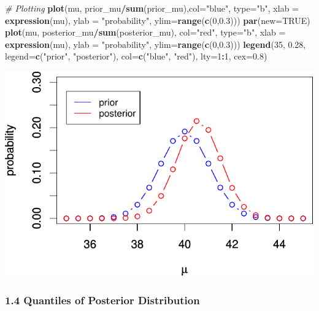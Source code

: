 \documentclass[
]{article}
\newenvironment{Shaded}{\begin{snugshade}}{\end{snugshade}}
\newcommand{\CommentTok}[1]{\textcolor[rgb]{0.56,0.35,0.01}{\textit{#1}}}
\newcommand{\DataTypeTok}[1]{\textcolor[rgb]{0.13,0.29,0.53}{#1}}
\newcommand{\DecValTok}[1]{\textcolor[rgb]{0.00,0.00,0.81}{#1}}
\newcommand{\FloatTok}[1]{\textcolor[rgb]{0.00,0.00,0.81}{#1}}
\newcommand{\KeywordTok}[1]{\textcolor[rgb]{0.13,0.29,0.53}{\textbf{#1}}}
\newcommand{\NormalTok}[1]{#1}
\newcommand{\OperatorTok}[1]{\textcolor[rgb]{0.81,0.36,0.00}{\textbf{#1}}}
\newcommand{\OtherTok}[1]{\textcolor[rgb]{0.56,0.35,0.01}{#1}}
\newcommand{\StringTok}[1]{\textcolor[rgb]{0.31,0.60,0.02}{#1}}
\begin{document}
\begin{Shaded}
\begin{Highlighting}[]
\CommentTok{# Plotting}
\KeywordTok{plot}\NormalTok{(mu, prior_mu}\OperatorTok{/}\KeywordTok{sum}\NormalTok{(prior_mu),}\DataTypeTok{col=}\StringTok{"blue"}\NormalTok{, }\DataTypeTok{type=}\StringTok{"b"}\NormalTok{, }\DataTypeTok{xlab =} \KeywordTok{expression}\NormalTok{(mu), }\DataTypeTok{ylab =} \StringTok{"probability"}\NormalTok{, }\DataTypeTok{ylim=}\KeywordTok{range}\NormalTok{(}\KeywordTok{c}\NormalTok{(}\DecValTok{0}\NormalTok{,}\FloatTok{0.3}\NormalTok{)))}
\KeywordTok{par}\NormalTok{(}\DataTypeTok{new=}\OtherTok{TRUE}\NormalTok{)}
\KeywordTok{plot}\NormalTok{(mu, posterior_mu}\OperatorTok{/}\KeywordTok{sum}\NormalTok{(posterior_mu), }\DataTypeTok{col=}\StringTok{"red"}\NormalTok{, }\DataTypeTok{type=}\StringTok{"b"}\NormalTok{, }\DataTypeTok{xlab =} \KeywordTok{expression}\NormalTok{(mu), }\DataTypeTok{ylab =} \StringTok{"probability"}\NormalTok{, }\DataTypeTok{ylim=}\KeywordTok{range}\NormalTok{(}\KeywordTok{c}\NormalTok{(}\DecValTok{0}\NormalTok{,}\FloatTok{0.3}\NormalTok{)))}
\KeywordTok{legend}\NormalTok{(}\DecValTok{35}\NormalTok{, }\FloatTok{0.28}\NormalTok{, }\DataTypeTok{legend=}\KeywordTok{c}\NormalTok{(}\StringTok{"prior"}\NormalTok{, }\StringTok{"posterior"}\NormalTok{),}
       \DataTypeTok{col=}\KeywordTok{c}\NormalTok{(}\StringTok{"blue"}\NormalTok{, }\StringTok{"red"}\NormalTok{), }\DataTypeTok{lty=}\DecValTok{1}\OperatorTok{:}\DecValTok{1}\NormalTok{, }\DataTypeTok{cex=}\FloatTok{0.8}\NormalTok{)}
\end{Highlighting}
\end{Shaded}

\includegraphics{STAT_205_HW2_files/figure-latex/unnamed-chunk-2-1.pdf}

\hypertarget{quantiles-of-posterior-distribution}{%
\subsubsection{1.4 Quantiles of Posterior
Distribution}\label{quantiles-of-posterior-distribution}}
\end{document}

